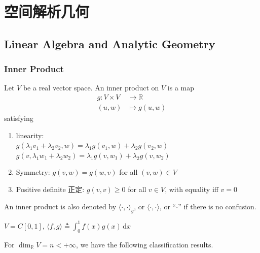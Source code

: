 
\section{空间解析几何}

\subsection*{Linear Algebra and Analytic Geometry}

\subsubsection{Inner Product}

Let $V$ be a real vector space. An inner product on $V$ is a map
\begin{align*}
    g: V \times V & \to \mathbb{R}  \\
    (u, w)        & \mapsto g(u, w)
\end{align*}
satisfying
\begin{enumerate}
    \item {}linearity:\\
          $g(\lambda_1v_1+\lambda_2v_2,w)=\lambda_1g(v_1,w)+\lambda_2g(v_2,w)$\\
          $g(v, \lambda_1w_1+\lambda_2w_2)=\lambda_1g(v,w_1)+\lambda_2g(v,w_2)$
    \item Symmetry: $g(v,w)=g(w,v)$ for all $(v,w)\in V$
    \item Positive definite 正定: $g(v,v)\geq 0$ for all $v\in V$, with equality iff $v=0$
\end{enumerate}

An inner product is also denoted by $\langle\cdot,\cdot\rangle_g$, or $\langle\cdot,\cdot\rangle$, or ``$\cdot$'' if there is no confusion.

\begin{example}
    $V=C[0,1],\,\langle f,g\rangle\triangleq\int_0^1 f(x)g(x)\,\mathrm{d}x$
\end{example}

For $\dim_{\mathbb{R}}V=n<+\infty$, we have the following classification results.

